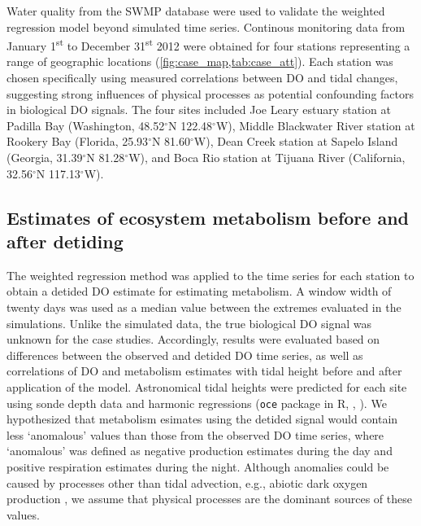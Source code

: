 \documentclass[letterpaper,12pt,oneside]{article}\usepackage[]{graphicx}\usepackage[]{color}
\begin{document}
Water quality from the \ac{SWMP} database  were used to validate the weighted regression model beyond simulated time series.  Continous monitoring data from January 1\textsuperscript{st} to December 31\textsuperscript{st} 2012 were obtained for four stations representing a range of geographic locations (\cref{fig:case_map,tab:case_att}).  Each station was chosen specifically using measured correlations between \ac{DO} and tidal changes, suggesting strong influences of physical processes as potential confounding factors in biological \ac{DO} signals.  The four sites included Joe Leary estuary station at Padilla Bay (Washington, 48.52$^{\circ}$N 122.48$^{\circ}$W), Middle Blackwater River station at Rookery Bay (Florida, 25.93$^{\circ}$N 81.60$^{\circ}$W), Dean Creek station at Sapelo Island (Georgia, 31.39$^{\circ}$N 81.28$^{\circ}$W), and Boca Rio station at Tijuana River (California, 32.56$^{\circ}$N 117.13$^{\circ}$W).

\subsection{Estimates of ecosystem metabolism before and after detiding}

The weighted regression method was applied to the time series for each station to obtain a detided \ac{DO} estimate for estimating metabolism.  A window width of twenty days was used as a median value between the extremes evaluated in the simulations. Unlike the simulated data, the true biological \ac{DO} signal was unknown for the case studies.  Accordingly, results were evaluated based on differences between the observed and detided \ac{DO} time series, as well as correlations of \ac{DO} and metabolism estimates with tidal height before and after application of the model.  Astronomical tidal heights were predicted for each site using sonde depth data and harmonic regressions (\texttt{oce} package in R, \citealt{Foreman89}, ).  We hypothesized that metabolism esimates using the detided signal would contain less `anomalous' values than those from the observed \ac{DO} time series, where `anomalous' was defined as negative production estimates during the day and positive respiration estimates during the night.  Although anomalies could be caused by processes other than tidal advection, e.g., abiotic dark oxygen production \citep{Pamatmat97}, we assume that physical processes are the dominant sources of these values.  
\end{document}
